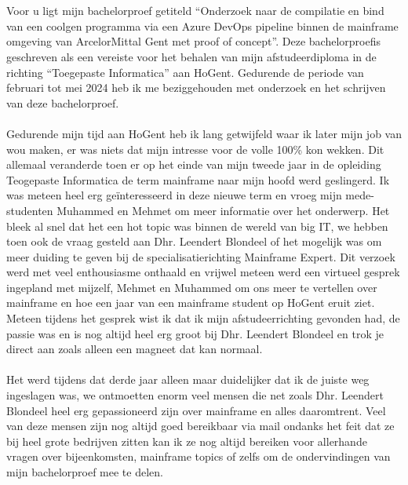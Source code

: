 
\chapter*{}%
\label{ch:voorwoord}

Voor u ligt mijn bachelorproef getiteld \enquote{Onderzoek naar de compilatie en bind van een coolgen programma via een Azure DevOps pipeline binnen de mainframe omgeving van ArcelorMittal Gent met proof of concept}. 
Deze bachelorproefis geschreven als een vereiste voor het behalen van mijn afstudeerdiploma in de richting \enquote{Toegepaste Informatica} aan HoGent.
Gedurende de periode van februari tot mei 2024 heb ik me beziggehouden met onderzoek en het schrijven van deze bachelorproef. 
\\ \\
Gedurende mijn tijd aan HoGent heb ik lang getwijfeld waar ik later mijn job van wou maken, er was niets dat mijn intresse voor de volle 100\% kon wekken. 
Dit allemaal veranderde toen er op het einde van mijn tweede jaar in de opleiding Teogepaste Informatica de term mainframe naar mijn hoofd werd geslingerd. 
Ik was meteen heel erg geïnteresseerd in deze nieuwe term en vroeg mijn mede-studenten Muhammed en Mehmet om meer informatie over het onderwerp. 
Het bleek al snel dat het een hot topic was binnen de wereld van big IT, we hebben toen ook de vraag gesteld aan Dhr. Leendert Blondeel of het mogelijk was om meer duiding te geven bij de specialisatierichting Mainframe Expert. 
Dit verzoek werd met veel enthousiasme onthaald en vrijwel meteen werd een virtueel gesprek ingepland met mijzelf, Mehmet en Muhammed om ons meer te vertellen over mainframe en hoe een jaar van een mainframe student op HoGent eruit ziet.
Meteen tijdens het gesprek wist ik dat ik mijn afstudeerrichting gevonden had, de passie was en is nog altijd heel erg groot bij Dhr. Leendert Blondeel en trok je direct aan zoals alleen een magneet dat kan normaal. 
\\ \\
Het werd tijdens dat derde jaar alleen maar duidelijker dat ik de juiste weg ingeslagen was, we ontmoetten enorm veel mensen die net zoals Dhr. Leendert Blondeel heel erg gepassioneerd zijn over mainframe en alles daaromtrent. 
Veel van deze mensen zijn nog altijd goed bereikbaar via mail ondanks het feit dat ze bij heel grote bedrijven zitten kan ik ze nog altijd bereiken voor allerhande vragen over bijeenkomsten, mainframe topics of zelfs om de ondervindingen van mijn bachelorproef mee te delen. 
